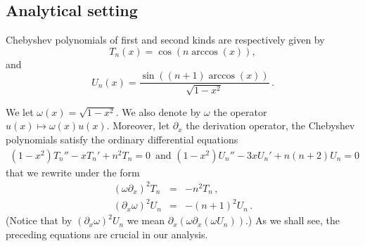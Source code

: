 \documentclass[a4paper]{article}
\begin{document}
	\subsection{Analytical setting}
	
	Chebyshev polynomials of first and second kinds are respectively given by 
	\[T_n(x) = \cos(n \arccos(x)),\]
	and 
	\[U_n(x) = \dfrac{\sin((n+1) \arccos(x))}{\sqrt{1 - x^2}}\,.\]
	
	We let $\omega(x) = \sqrt{1-x^2}$. We also denote by $\omega$ the operator $u(x) \mapsto \omega(x)u(x)$. Moreover, let $\partial_x$ the derivation operator, the Chebyshev polynomials satisfy
	the ordinary differential equations
	\begin{eqnarray*}
		(1-x^2)T_n'' -xT_n' +n^2T_n =0\,\mbox{ and }(1-x^2)U_n'' -3xU_n' +n(n+2)U_n =0
	\end{eqnarray*}
	that we rewrite under the form
	\begin{eqnarray}
	(\omega\partial_x)^2 T_n &=& -n^2T_n\,, \label{cheb1}\\
	(\partial_x\omega)^2 U_n &=& -(n+1)^2U_n\, .\label{cheb2}
	\end{eqnarray}
	(Notice that by $(\partial_x\omega)^2 U_n$ we mean $\partial_x(\omega \partial_x (\omega U_n))$.)
	As we shall see, the preceding equations are crucial in our analysis. 
	
\end{document}
